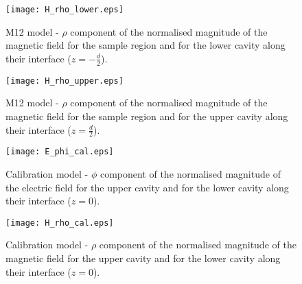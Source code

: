 \begin{figure}
\centering
\texttt{[image: H\_rho\_lower.eps]}
\caption{M12 model - $\rho$ component of the normalised magnitude of the magnetic field for the sample region and for the lower cavity along their interface ($z=-\frac{d}{2}$).}\label{fig:hrhol}
\end{figure}
\begin{figure}
\centering
\texttt{[image: H\_rho\_upper.eps]}
\caption{M12 model - $\rho$ component of the normalised magnitude of the magnetic field for the sample region and for the upper cavity along their interface ($z=\frac{d}{2}$).}\label{fig:hrhou}
\end{figure}
\begin{figure}
\centering
\texttt{[image: E\_phi\_cal.eps]}
\caption{Calibration model - $\phi$ component of the normalised magnitude of the electric field for the upper cavity and for the lower cavity along their interface ($z=0$).}\label{fig:ephical}
\end{figure}
\begin{figure}
\centering
\texttt{[image: H\_rho\_cal.eps]}
\caption{Calibration model - $\rho$ component of the normalised magnitude of the magnetic field for the upper cavity and for the lower cavity along their interface ($z=0$).}\label{fig:hrhocal}
\end{figure}